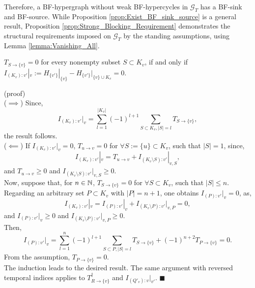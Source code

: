 \documentclass{comnet}%
\begin{document}
Therefore, a BF-hypergraph without weak BF-hypercycles in $\mathcal{G}_{T}$ has a BF-sink and BF-source. While Proposition \ref{prop:Exist_BF_sink_source} is a general result, Proposition \ref{prop:Strong_Blocking_Requirement} demonstrates the structural requirements imposed on $\mathcal G_T$ by the standing assumptions, using Lemma \ref{lemma:Vanishing_All}.\\

\begin{lemma}
	$T_{S \to \{v\}} = 0$ for every nonempty subset $S \subset K_{v}$, if and only if $I_{(K_{v}) : v'}|_{v} := H_{\{v'\}}|_{\{v\}} - H_{\{v'\}}|_{\{v\} \cup K_{v}} = 0$.\\
	\label{lemma:Vanishing_All}\end{lemma}
(proof)\\
($\implies$) Since, 
\begin{equation}
	I_{(K_{v}) : v'}|_{v} = \sum_{l=1}^{|K_{v}|} (-1)^{l+1}\sum_{S \subset  K_{v}, |S|=l} T_{S \to \{v\}},
\end{equation}
the result follows.\\
($\impliedby$) If $I_{(K_{v}) : v'}|_{v} = 0$, $T_{u \to v} = 0$ for $\forall S:= \{u\} \subset K_{v}$, such that $|S| = 1$, since,
\begin{equation}
	I_{(K_{v}) : v'}|_{v} = T_{u \to v} + I_{(K_{v} \setminus S) : v'}|_{v, S},
\end{equation}
and $T_{u \to v} \geqslant 0$ and $I_{(K_{v} \setminus S) : v'}|_{v, S} \geqslant 0$.\\
Now, suppose that, for $n \in \Bbb N$, $T_{S \to \{v\}} = 0$ for $\forall S \subset K_{v}$, such that $|S| \leqslant n$. Regarding an arbitrary set $P \subset K_{v}$ with $|P| = n+1$, one obtains $I_{(P) : v'}|_{v} = 0$, as,
\begin{equation}
	I_{(K_{v}) : v'}|_{v} = I_{(P) : v'}|_{v} + I_{(K_{v} \setminus P) : v'}|_{v, P} = 0,
\end{equation}
and $I_{(P) : v'}|_{v} \geqslant 0$ and $I_{(K_{v} \setminus P) : v'}|_{v, P} \geqslant 0$.\\
Then, 
\begin{equation}
	I_{(P) : v'}|_{v} = \sum_{l=1}^{n} (-1)^{l+1}\sum_{S \subset P, |S| = l} T_{S \to \{v\}} + (-1)^{n+2} T_{P \to \{v\}} = 0.
\end{equation}
From the assumption, $T_{P \to \{v\}} = 0$.\\
The induction leads to the desired result. The same argument with reversed temporal indices applies to $T^{\dagger}_{R\to\{v\}}$ and $I_{(Q'_v):v}|_{v'}$. $\blacksquare$ \\
\end{document}
